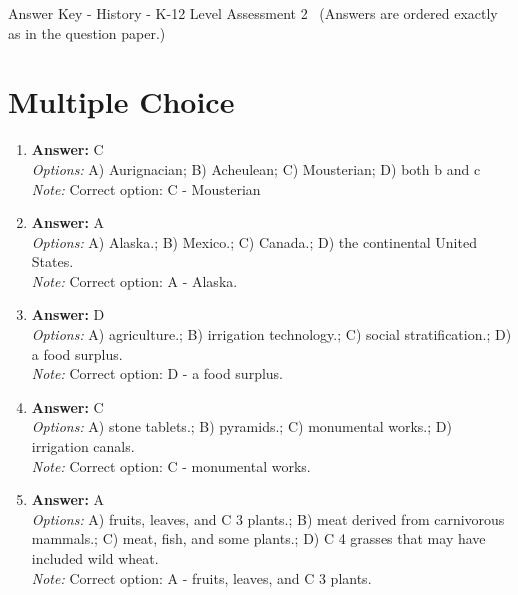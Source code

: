 \documentclass[12pt]{article}
\begin{document}
\begin{center}
Answer Key - History - K-12 Level Assessment 2 \
\small (Answers are ordered exactly as in the question paper.)
\end{center}

\section*{Multiple Choice}
\begin{enumerate}[label=\arabic*.]
\item \textbf{Answer:} C
\\ \textit{Options:} A) Aurignacian; B) Acheulean; C) Mousterian; D) both b and c
\\ \textit{Note:} Correct option: C - Mousterian
\item \textbf{Answer:} A
\\ \textit{Options:} A) Alaska.; B) Mexico.; C) Canada.; D) the continental United States.
\\ \textit{Note:} Correct option: A - Alaska.
\item \textbf{Answer:} D
\\ \textit{Options:} A) agriculture.; B) irrigation technology.; C) social stratification.; D) a food surplus.
\\ \textit{Note:} Correct option: D - a food surplus.
\item \textbf{Answer:} C
\\ \textit{Options:} A) stone tablets.; B) pyramids.; C) monumental works.; D) irrigation canals.
\\ \textit{Note:} Correct option: C - monumental works.
\item \textbf{Answer:} A
\\ \textit{Options:} A) fruits, leaves, and C 3 plants.; B) meat derived from carnivorous mammals.; C) meat, fish, and some plants.; D) C 4 grasses that may have included wild wheat.
\\ \textit{Note:} Correct option: A - fruits, leaves, and C 3 plants.
\end{enumerate}
\end{document}
